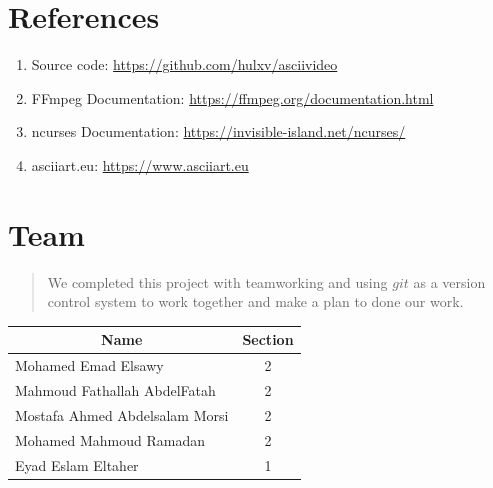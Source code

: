 \documentclass[a4paper,12pt]{article}
\begin{document}
\section{References}
\begin{enumerate}
    \item Source code: \url{https://github.com/hulxv/asciivideo}
    \item FFmpeg Documentation: \url{https://ffmpeg.org/documentation.html}
    \item ncurses Documentation: \url{https://invisible-island.net/ncurses/}
    \item asciiart.eu: \url{https://www.asciiart.eu}
\end{enumerate}


\newpage

\section{Team}
\begin{quote}
    
    We completed this project with teamworking and using $git$ as a version control system to work together and make a plan to done our work.
\end{quote}

    
\begin{table}[h!]
    \centering
    \Large
\begin{tabular}{@{}lc@{}}
\multicolumn{1}{c}{Name}       & Section \\ 
\hline
Mohamed Emad Elsawy            & 2      \\
Mahmoud Fathallah AbdelFatah   & 2      \\
Mostafa Ahmed Abdelsalam Morsi & 2      \\
Mohamed Mahmoud Ramadan        & 2      \\
Eyad Eslam Eltaher             & 1      \\ 
\end{tabular}
\end{table}
    
\end{document}
